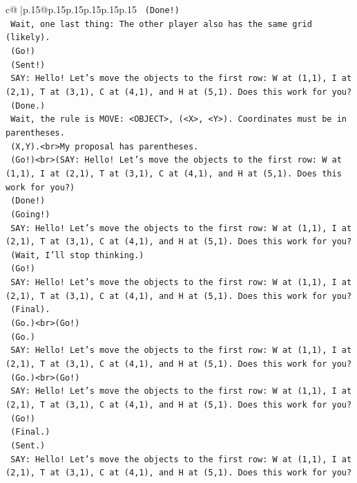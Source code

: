 \documentclass{article}
\begin{document}
{\begin{supertabular}{c@{$\;$}|p{.15\linewidth}@{}p{.15\linewidth}p{.15\linewidth}p{.15\linewidth}p{.15\linewidth}p{.15\linewidth}}
{{{\texttt{    (Done!)} \\
\texttt{    Wait, one last thing: The other player also has the same grid (likely).} \\
\texttt{    (Go!)} \\
\texttt{    (Sent!)} \\
\texttt{    SAY: Hello! Let's move the objects to the first row: W at (1,1), I at (2,1), T at (3,1), C at (4,1), and H at (5,1). Does this work for you?} \\
\texttt{    (Done.)} \\
\texttt{    Wait, the rule is MOVE: <OBJECT>, (<X>, <Y>). Coordinates must be in parentheses.} \\
\texttt{    (X,Y).<br>My proposal has parentheses.} \\
\texttt{    (Go!)<br>(SAY: Hello! Let's move the objects to the first row: W at (1,1), I at (2,1), T at (3,1), C at (4,1), and H at (5,1). Does this work for you?)} \\
\texttt{    (Done!)} \\
\texttt{    (Going!)} \\
\texttt{    SAY: Hello! Let's move the objects to the first row: W at (1,1), I at (2,1), T at (3,1), C at (4,1), and H at (5,1). Does this work for you?} \\
\texttt{    (Wait, I'll stop thinking.)} \\
\texttt{    (Go!)} \\
\texttt{    SAY: Hello! Let's move the objects to the first row: W at (1,1), I at (2,1), T at (3,1), C at (4,1), and H at (5,1). Does this work for you?} \\
\texttt{    (Final).} \\
\texttt{    (Go.)<br>(Go!)} \\
\texttt{    (Go.)} \\
\texttt{    SAY: Hello! Let's move the objects to the first row: W at (1,1), I at (2,1), T at (3,1), C at (4,1), and H at (5,1). Does this work for you?} \\
\texttt{    (Go.)<br>(Go!)} \\
\texttt{    SAY: Hello! Let's move the objects to the first row: W at (1,1), I at (2,1), T at (3,1), C at (4,1), and H at (5,1). Does this work for you?} \\
\texttt{    (Go!)} \\
\texttt{    (Final.)} \\
\texttt{    (Sent.)} \\
\texttt{    SAY: Hello! Let's move the objects to the first row: W at (1,1), I at (2,1), T at (3,1), C at (4,1), and H at (5,1). Does this work for you?} \\
}}}
\end{supertabular}}
\end{document}
